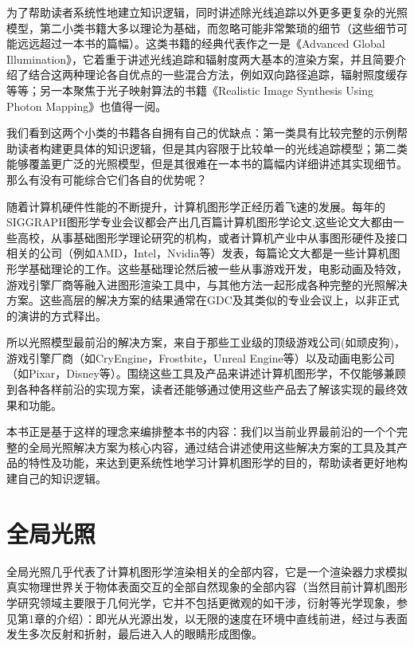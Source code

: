 为了帮助读者系统性地建立知识逻辑，同时讲述除光线追踪以外更多更复杂的光照模型，第二小类书籍大多以理论为基础，而忽略可能非常繁琐的细节（这些细节可能远远超过一本书的篇幅）。这类书籍的经典代表作之一是《Advanced Global Illumination》，它着重于讲述光线追踪和辐射度两大基本的渲染方案，并且简要介绍了结合这两种理论各自优点的一些混合方法，例如双向路径追踪，辐射照度缓存等等；另一本聚焦于光子映射算法的书籍《Realistic Image Synthesis Using Photon Mapping》\cite{b:RealisticImageSynthesisUsingPhotonMapping}也值得一阅。

我们看到这两个小类的书籍各自拥有自己的优缺点：第一类具有比较完整的示例帮助读者构建更具体的知识逻辑，但是其内容限于比较单一的光线追踪模型；第二类能够覆盖更广泛的光照模型，但是其很难在一本书的篇幅内详细讲述其实现细节。那么有没有可能综合它们各自的优势呢？

随着计算机硬件性能的不断提升，计算机图形学正经历着飞速的发展。每年的SIGGRAPH图形学专业会议都会产出几百篇计算机图形学论文,这些论文大都由一些高校，从事基础图形学理论研究的机构，或者计算机产业中从事图形硬件及接口相关的公司（例如AMD，Intel，Nvidia等）发表，每篇论文大都是一些计算机图形学基础理论的工作。这些基础理论然后被一些从事游戏开发，电影动画及特效，游戏引擎厂商等融入进图形渲染工具中，与其他方法一起形成各种完整的光照解决方案。这些高层的解决方案的结果通常在GDC及其类似的专业会议上，以非正式的演讲的方式释出。

所以光照模型最前沿的解决方案，来自于那些工业级的顶级游戏公司(如顽皮狗)，游戏引擎厂商（如CryEngine，Frostbite，Unreal Engine等）以及动画电影公司（如Pixar，Disney等）。围绕这些工具及产品来讲述计算机图形学，不仅能够兼顾到各种各样前沿的实现方案，读者还能够通过使用这些产品去了解该实现的最终效果和功能。

本书正是基于这样的理念来编排整本书的内容：我们以当前业界最前沿的一个个完整的全局光照解决方案为核心内容，通过结合讲述使用这些解决方案的工具及其产品的特性及功能，来达到更系统性地学习计算机图形学的目的，帮助读者更好地构建自己的知识逻辑。



\section*{全局光照}
全局光照几乎代表了计算机图形学渲染相关的全部内容，它是一个渲染器力求模拟真实物理世界关于物体表面交互的全部自然现象的全部内容（当然目前计算机图形学研究领域主要限于几何光学，它并不包括更微观的如干涉，衍射等光学现象，参见第1章的介绍）：即光从光源出发，以无限的速度在环境中直线前进，经过与表面发生多次反射和折射，最后进入人的眼睛形成图像。

